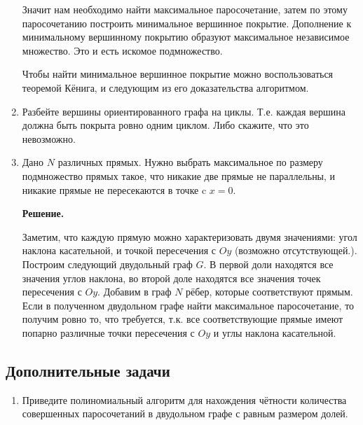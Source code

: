 \begin{enumerate}
	Значит нам необходимо найти максимальное паросочетание, затем по этому паросочетанию построить 
	минимальное вершинное покрытие. Дополнение к минимальному вершинному покрытию образуют максимальное 
	независимое множество. Это и есть искомое подмножество.
	
	Чтобы найти минимальное вершинное покрытие можно воспользоваться теоремой Кёнига, и следующим из его 
	доказательства алгоритмом.
	
	\item Разбейте вершины ориентированного графа на циклы. Т.е. каждая вершина должна быть покрыта ровно одним 
	циклом. Либо скажите, что это невозможно.
	\item Дано $N$ различных прямых. Нужно выбрать максимальное по размеру подмножество прямых такое, что никакие 
	две прямые не параллельны, и никакие прямые не пересекаются в точке c $x = 0$.
	
	\textbf{Решение.}
	
	Заметим, что каждую прямую можно характеризовать двумя значениями: угол наклона касательной, и точкой 
	пересечения с $Oy$ (возможно отсутствующей.). Построим следующий двудольный граф $G$. В первой доли находятся 
	все значения углов наклона, во второй доле находятся все значения точек пересечения с $Oy$. Добавим в граф 
	$N$ рёбер, которые соответствуют прямым. Если в полученном двудольном графе найти максимальное паросочетание, 
	то получим ровно то, что требуется, т.к. все соответствующие прямые имеют попарно различные точки пересечения 
	с $Oy$ и углы наклона касательной. 
	 
\end{enumerate}

\subsection*{Дополнительные задачи}
\begin{enumerate}
	\item Приведите полиномиальный алгоритм для нахождения чётности количества совершенных паросочетаний в 
	двудольном графе с равным размером долей.
\end{enumerate}